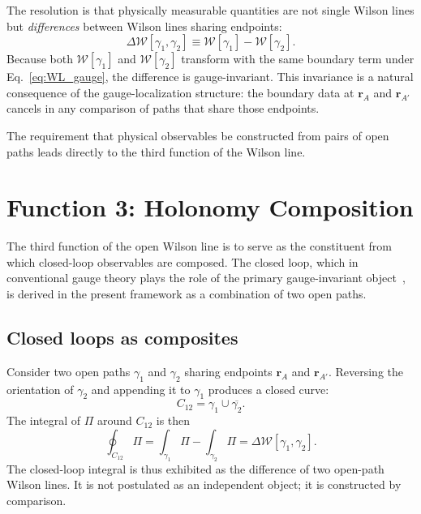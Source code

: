 \documentclass[%
 reprint, amsmath,amssymb, aps, prb, ]{revtex4-2}
\numberwithin{equation}{section}
\newcommand{\WL}{\mathcal{W}}
\begin{document}
The resolution is that physically measurable quantities are not single Wilson lines but \emph{differences} between Wilson lines sharing endpoints:
\begin{equation}
\Delta\WL[\gamma_1, \gamma_2] \equiv \WL[\gamma_1] - \WL[\gamma_2].
\label{eq:delta_WL}
\end{equation}
Because both $\WL[\gamma_1]$ and $\WL[\gamma_2]$ transform with the same boundary term under Eq.~\eqref{eq:WL_gauge}, the difference is gauge-invariant. This invariance is a natural consequence of the gauge-localization structure: the boundary data at $\mathbf{r}_A$ and $\mathbf{r}_{A'}$ cancels in any comparison of paths that share those endpoints.

The requirement that physical observables be constructed from pairs of open paths leads directly to the third function of the Wilson line.

\section{Function 3: Holonomy Composition}
\label{sec:composition}

The third function of the open Wilson line is to serve as the constituent from which closed-loop observables are composed. The closed loop, which in conventional gauge theory plays the role of the primary gauge-invariant object~\cite{WuYang1975, Nakahara2003}, is derived in the present framework as a combination of two open paths.

\subsection{Closed loops as composites}

Consider two open paths $\gamma_1$ and $\gamma_2$ sharing endpoints $\mathbf{r}_A$ and $\mathbf{r}_{A'}$. Reversing the orientation of $\gamma_2$ and appending it to $\gamma_1$ produces a closed curve:
\begin{equation}
C_{12} = \gamma_1 \cup \overline{\gamma_2}.
\label{eq:C12}
\end{equation}
The integral of $\Pi$ around $C_{12}$ is then
\begin{equation}
\oint_{C_{12}} \Pi = \int_{\gamma_1} \Pi - \int_{\gamma_2} \Pi = \Delta\WL[\gamma_1, \gamma_2].
\label{eq:loop_as_diff}
\end{equation}
The closed-loop integral is thus exhibited as the difference of two open-path Wilson lines. It is not postulated as an independent object; it is constructed by comparison.
\end{document}

